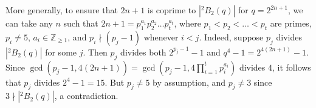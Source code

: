 \documentclass[11pt]{amsart}
\theoremstyle{plain}
\theoremstyle{definition}
\numberwithin{thm}{section}
\numberwithin{equation}{thm}
\newcommand{\Z}{{\mathbb Z}}
\newcommand{\0}{\emptyset}
\newcommand{\tw}[1]{{}^#1\!}
\newcommand{\edit}[1]{{\color{red} #1}}
\begin{document}
More generally, to ensure that $2n+1$ is coprime to $|\tw2 B_2(q)|$ for $q=2^{2n+1}$, we can take any $n$ such that
$2n+1 = p_1^{a_1}p_2^{a_2} \ldots p_t^{a_t}$, where $p_1 < p_2 < \ldots < p_t$ are primes, $p_i \neq 5$, $a_i \in \Z_{\geq 1}$, and 
$p_i \nmid (p_j-1)$ whenever $i < j$. 
Indeed, suppose $p_j$ divides $|\tw2 B_2(q)|$ for some $j$. Then $p_j$ divides both $2^{p_j-1}-1$ and $q^4-1 = 2^{4(2n+1)}-1$. 
Since $\gcd(p_j-1,4(2n+1)) = \gcd(p_j-1,4\prod^t_{i=1}p_i^{a_i})$ divides $4$, it follows that $p_j$ divides $2^4-1=15$.
But $p_j \neq 5$ by assumption, and $p_j \neq 3$ since $3 \nmid |\tw2 B_2(q)|$, a contradiction. 
\end{document}
